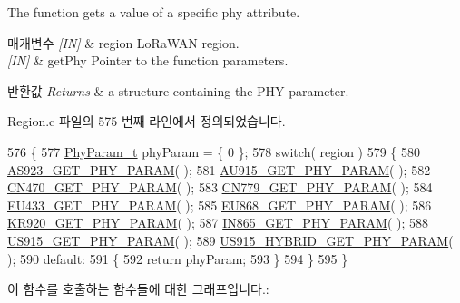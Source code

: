 The function gets a value of a specific phy attribute. 


\begin{DoxyParams}{매개변수}
{\em \mbox{[}\+I\+N\mbox{]}} & region Lo\+Ra\+W\+AN region.\\
\hline
{\em \mbox{[}\+I\+N\mbox{]}} & get\+Phy Pointer to the function parameters.\\
\hline
\end{DoxyParams}

\begin{DoxyRetVals}{반환값}
{\em Returns} & a structure containing the P\+HY parameter. \\
\hline
\end{DoxyRetVals}


Region.\+c 파일의 575 번째 라인에서 정의되었습니다.


\begin{DoxyCode}
576 \{
577     \mbox{\hyperlink{unionu_phy_param}{PhyParam\_t}} phyParam = \{ 0 \};
578     \textcolor{keywordflow}{switch}( region )
579     \{
580         \mbox{\hyperlink{_region_8c_a8646b89faa806726db169c655722774d}{AS923\_GET\_PHY\_PARAM}}( );
581         \mbox{\hyperlink{_region_8c_ab6486b65901c40026631dceb38d97859}{AU915\_GET\_PHY\_PARAM}}( );
582         \mbox{\hyperlink{_region_8c_a34e51818814f3d6a3002edea59b25145}{CN470\_GET\_PHY\_PARAM}}( );
583         \mbox{\hyperlink{_region_8c_a5a4a779a365decfa2899f6057bc28089}{CN779\_GET\_PHY\_PARAM}}( );
584         \mbox{\hyperlink{_region_8c_af1211cf2b1235d1561c3da107a2b8462}{EU433\_GET\_PHY\_PARAM}}( );
585         \mbox{\hyperlink{_region_8c_a111b83453324fea706c887ef27c77a48}{EU868\_GET\_PHY\_PARAM}}( );
586         \mbox{\hyperlink{_region_8c_a4544673fcff90d970b221e710013fe28}{KR920\_GET\_PHY\_PARAM}}( );
587         \mbox{\hyperlink{_region_8c_aa7080fbf9a840dd9219f4c9eda87d48c}{IN865\_GET\_PHY\_PARAM}}( );
588         \mbox{\hyperlink{_region_8c_a967ee384e993dfb297bae9faaa0441e1}{US915\_GET\_PHY\_PARAM}}( );
589         \mbox{\hyperlink{_region_8c_a3dcf34fcccf2c17f972fc1030c54e1e8}{US915\_HYBRID\_GET\_PHY\_PARAM}}( );
590         \textcolor{keywordflow}{default}:
591         \{
592             \textcolor{keywordflow}{return} phyParam;
593         \}
594     \}
595 \}
\end{DoxyCode}
이 함수를 호출하는 함수들에 대한 그래프입니다.\+:
\mbox{\label{group___r_e_g_i_o_n_ga54b1b27a8431cd146b4dc33a894ee6db}} 
